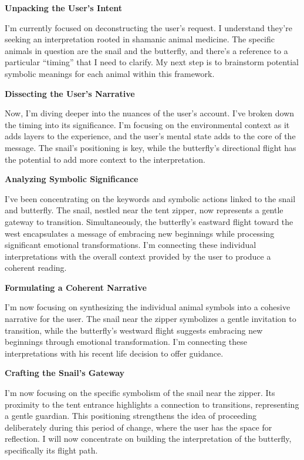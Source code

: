 \documentclass{article}
\begin{document}
\textbf{Unpacking the User's Intent}

I'm currently focused on deconstructing the user's request. I understand they're seeking an interpretation rooted in shamanic animal medicine. The specific animals in question are the snail and the butterfly, and there's a reference to a particular ``timing'' that I need to clarify. My next step is to brainstorm potential symbolic meanings for each animal within this framework.

\textbf{Dissecting the User's Narrative}

Now, I'm diving deeper into the nuances of the user's account. I've broken down the timing into its significance. I'm focusing on the environmental context as it adds layers to the experience, and the user's mental state adds to the core of the message. The snail's positioning is key, while the butterfly's directional flight has the potential to add more context to the interpretation.

\textbf{Analyzing Symbolic Significance}

I've been concentrating on the keywords and symbolic actions linked to the snail and butterfly. The snail, nestled near the tent zipper, now represents a gentle gateway to transition. Simultaneously, the butterfly's eastward flight toward the west encapsulates a message of embracing new beginnings while processing significant emotional transformations. I'm connecting these individual interpretations with the overall context provided by the user to produce a coherent reading.

\textbf{Formulating a Coherent Narrative}

I'm now focusing on synthesizing the individual animal symbols into a cohesive narrative for the user. The snail near the zipper symbolizes a gentle invitation to transition, while the butterfly's westward flight suggests embracing new beginnings through emotional transformation. I'm connecting these interpretations with his recent life decision to offer guidance.

\textbf{Crafting the Snail's Gateway}

I'm now focusing on the specific symbolism of the snail near the zipper. Its proximity to the tent entrance highlights a connection to transitions, representing a gentle guardian. This positioning strengthens the idea of proceeding deliberately during this period of change, where the user has the space for reflection. I will now concentrate on building the interpretation of the butterfly, specifically its flight path.
\end{document}

